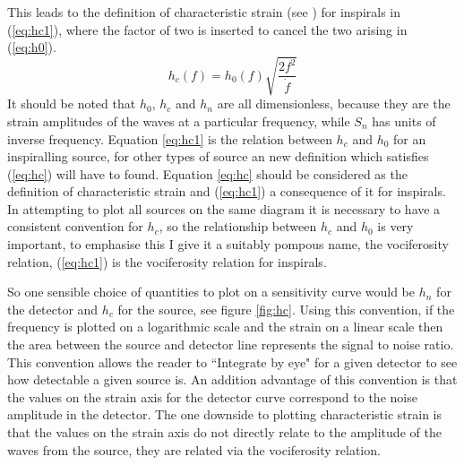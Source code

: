 This leads to the definition of characteristic strain (see \cite{FinnThorne}) for inspirals in (\ref{eq:hc1}), where the factor of two is inserted to cancel the two arising in (\ref{eq:h0}).
\begin{equation}\label{eq:hc1} h_{c}(f)=h_{0}(f)\sqrt{\frac{2f^{2}}{\dot{f}}} \end{equation}
It should be noted that $h_{0}$, $h_{c}$ and $h_{n}$ are all dimensionless, because they are the strain amplitudes of the waves at a particular frequency, while $S_{n}$ has units of inverse frequency. Equation \ref{eq:hc1} is the relation between $h_{c}$ and $h_{0}$ for an inspiralling source, for other types of source an new definition which satisfies (\ref{eq:hc}) will have to found. Equation \ref{eq:hc} should be considered as the definition of characteristic strain and (\ref{eq:hc1}) a consequence of it for inspirals. In attempting to plot all sources on the same diagram it is necessary to have a consistent convention for $h_{c}$, so the relationship between $h_{c}$ and $h_{0}$ is very important, to emphasise this I give it a suitably pompous name, the vociferosity relation, (\ref{eq:hc1}) is the vociferosity relation for inspirals.

So one sensible choice of quantities to plot on a sensitivity curve would be $h_{n}$ for the detector and $h_{c}$ for the source, see figure \ref{fig:hc}. Using this convention, if the frequency is plotted on a logarithmic scale and the strain on a linear scale then the area between the source and detector line represents the signal to noise ratio. This convention allows the reader to ``Integrate by eye" for a given detector to see how detectable a given source is. An addition advantage of this convention is that the values on the strain axis for the detector curve correspond to the noise amplitude in the detector. The one downside to plotting characteristic strain is that the values on the strain axis do not directly relate to the amplitude of the waves from the source, they are related via the vociferosity relation.

